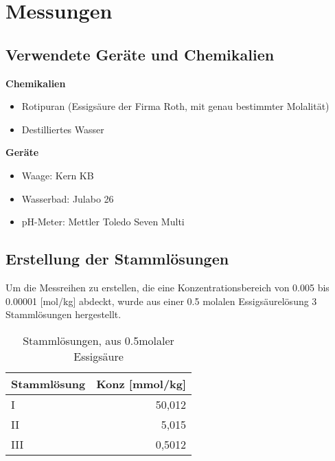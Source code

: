 \section{Messungen}

\subsection{Verwendete Geräte und Chemikalien}
\vspace{.5cm}
\begin{minipage}[H][3cm][t]{0.4\textwidth}
  \textbf{Chemikalien}
  \begin{itemize}
    \item Rotipuran (Essigsäure der Firma Roth, mit genau bestimmter Molalität)
    \item Destilliertes Wasser
  \end{itemize}
\end{minipage}
\begin{minipage}[H][3cm][t]{0.4\textwidth}
  \textbf{Geräte}
  \begin{itemize}
    \item Waage: Kern KB
    \item Wasserbad: Julabo 26
    \item pH-Meter: Mettler Toledo Seven Multi
  \end{itemize}
\end{minipage}

\subsection{Erstellung der Stammlösungen}
Um die Messreihen zu erstellen, die eine Konzentrationsbereich von 0.005 bis 0.00001 [mol/kg]
abdeckt, wurde aus einer 0.5 molalen Essigsäurelösung 3 Stammlösungen hergestellt.

\begin{table}[htbp]
    \centering
    \caption{Stammlösungen, aus 0.5molaler Essigsäure}
      \begin{tabular}{lr}
      \toprule
      \textbf{Stammlösung} & \multicolumn{1}{l}{\textbf{Konz [mmol/kg]}} \\
      \midrule
      I     & 50,012 \\
      II    & 5,015 \\
      III   & 0,5012 \\
      \bottomrule
      \end{tabular}%
    \label{tab:addlabel}%
\end{table}%
  
